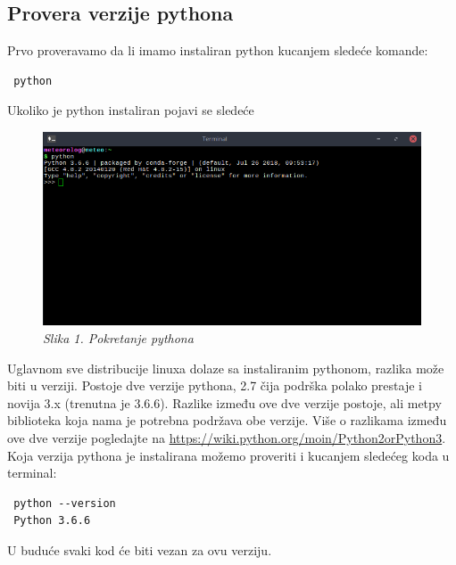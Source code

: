 \documentclass[12pt]{article}
\begin{document}
 \subsection{Provera verzije pythona}
Prvo proveravamo da li imamo instaliran python kucanjem sledeće komande:
\begin{lstlisting}
 python 
\end{lstlisting}
Ukoliko je python instaliran pojavi se sledeće
\begin{figure}[h!]
\centering
\includegraphics[width=1.\linewidth]{python.png}
\caption*{\textsl{Slika 1. Pokretanje pythona}}
\end{figure}
Uglavnom sve distribucije linuxa dolaze sa instaliranim pythonom, razlika može biti u verziji. Postoje dve verzije pythona, 2.7 čija podrška polako prestaje i novija 3.x (trenutna je 3.6.6). Razlike između ove dve verzije postoje, ali metpy biblioteka koja nama je potrebna podržava obe verzije. Više o razlikama između ove dve verzije pogledajte na \url{https://wiki.python.org/moin/Python2orPython3}. Koja verzija pythona je instalirana možemo proveriti i kucanjem sledećeg koda u terminal:
\begin{lstlisting}
 python --version
 Python 3.6.6
\end{lstlisting}  
U buduće svaki kod će biti vezan za ovu verziju.
\end{document}
